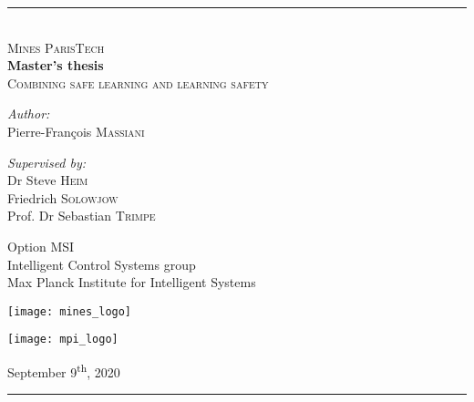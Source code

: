 
\begin{titlepage}
	
	\center  %
	
	\rule{\linewidth}{0.3mm}\\[1cm]
	
	\textsc{\LARGE Mines ParisTech}\\[2cm]
	
	\Huge{\textbf{Master's thesis}}\\[0.3cm]
	
	\Huge{\textsc{Combining safe learning and learning safety}}\\[1.5cm]
	
	\begin{minipage}{0.4\textwidth}
		\begin{flushleft} \large
			\emph{Author:}\\
			{Pierre-François \textsc{Massiani}} %
		\end{flushleft}
	\end{minipage}
	\begin{minipage}{0.5\textwidth}
		\begin{flushright} \large
			\emph{Supervised by:} \\
			{Dr Steve \textsc{Heim}\\Friedrich \textsc{Solowjow}\\Prof. Dr Sebastian \textsc{Trimpe}} %
		\end{flushright}
	\end{minipage}
	\vfill
	
	\large{Option MSI}\\
	\large{Intelligent Control Systems group}\\
	\large{Max Planck Institute for Intelligent Systems}
	\vfill
	\begin{minipage}{\linewidth}
		\begin{minipage}{0.5\linewidth}
		\begin{flushleft}
			\texttt{[image: mines\_logo]}
		\end{flushleft}
	\end{minipage}
	\begin{minipage}{0.5\linewidth}
		\begin{flushright}
			\texttt{[image: mpi\_logo]}
	\end{flushright}
	\end{minipage}
	\end{minipage}
	
	\vfill  %
	
	\large{September 9\textsuperscript{th}, 2020}\\[1cm]
	\rule{\linewidth}{0.3mm}
\end{titlepage}
